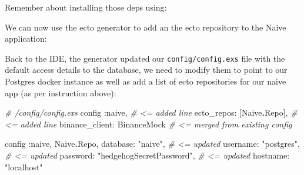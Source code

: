 \documentclass[
  oneside]{book}
\newenvironment{Shaded}{\begin{snugshade}}{\end{snugshade}}
\newcommand{\CommentTok}[1]{\textcolor[rgb]{0.56,0.35,0.01}{\textit{#1}}}
\newcommand{\ConstantTok}[1]{\textcolor[rgb]{0.56,0.35,0.01}{#1}}
\newcommand{\ExtensionTok}[1]{#1}
\newcommand{\NormalTok}[1]{#1}
\newcommand{\OperatorTok}[1]{\textcolor[rgb]{0.81,0.36,0.00}{\textbf{#1}}}
\newcommand{\OtherTok}[1]{\textcolor[rgb]{0.56,0.35,0.01}{#1}}
\newcommand{\SpecialCharTok}[1]{\textcolor[rgb]{0.81,0.36,0.00}{\textbf{#1}}}
\newcommand{\StringTok}[1]{\textcolor[rgb]{0.31,0.60,0.02}{#1}}
\newcommand{\VariableTok}[1]{\textcolor[rgb]{0.00,0.00,0.00}{#1}}
\begin{document}
Remember about installing those deps using:

\begin{Shaded}
\end{Shaded}

We can now use the ecto generator to add an the ecto repository to the Naive application:

\begin{Shaded}
\end{Shaded}

Back to the IDE, the generator updated our \texttt{config/config.exs} file with the default access details to the database, we need to modify them to point to our Postgres docker instance as well as add a list of ecto repositories for our naive app (as per instruction above):

\begin{Shaded}
\begin{Highlighting}[]
\CommentTok{\# /config/config.exs}
\NormalTok{config }\VariableTok{:naive}\NormalTok{,                }\CommentTok{\# \textless{}= added line}
  \VariableTok{ecto\_repos:} \OtherTok{[}\ConstantTok{Naive}\OperatorTok{.}\ConstantTok{Repo}\OtherTok{]}\NormalTok{,   }\CommentTok{\# \textless{}= added line}
  \VariableTok{binance\_client:} \ConstantTok{BinanceMock} \CommentTok{\# \textless{}= merged from existing config}

\NormalTok{config }\VariableTok{:naive}\NormalTok{, }\ConstantTok{Naive}\OperatorTok{.}\ConstantTok{Repo}\NormalTok{,}
  \VariableTok{database:} \StringTok{"naive"}\NormalTok{,                  }\CommentTok{\# \textless{}= updated}
  \VariableTok{username:} \StringTok{"postgres"}\NormalTok{,               }\CommentTok{\# \textless{}= updated}
  \VariableTok{password:} \StringTok{"hedgehogSecretPassword"}\NormalTok{, }\CommentTok{\# \textless{}= updated}
  \VariableTok{hostname:} \StringTok{"localhost"}
\end{Highlighting}
\end{Shaded}
\end{document}
